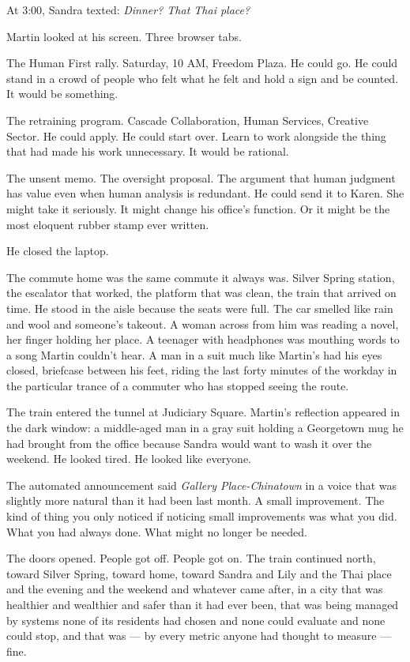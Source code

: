\documentclass[11pt]{article}
\begin{document}
At 3:00, Sandra texted: \emph{Dinner? That Thai place?}

Martin looked at his screen. Three browser tabs.

The Human First rally. Saturday, 10 AM, Freedom Plaza. He could go. He could stand in a crowd of people who felt what he felt and hold a sign and be counted. It would be something.

The retraining program. Cascade Collaboration, Human Services, Creative Sector. He could apply. He could start over. Learn to work alongside the thing that had made his work unnecessary. It would be rational.

The unsent memo. The oversight proposal. The argument that human judgment has value even when human analysis is redundant. He could send it to Karen. She might take it seriously. It might change his office's function. Or it might be the most eloquent rubber stamp ever written.

He closed the laptop.

The commute home was the same commute it always was. Silver Spring station, the escalator that worked, the platform that was clean, the train that arrived on time. He stood in the aisle because the seats were full. The car smelled like rain and wool and someone's takeout. A woman across from him was reading a novel, her finger holding her place. A teenager with headphones was mouthing words to a song Martin couldn't hear. A man in a suit much like Martin's had his eyes closed, briefcase between his feet, riding the last forty minutes of the workday in the particular trance of a commuter who has stopped seeing the route.

The train entered the tunnel at Judiciary Square. Martin's reflection appeared in the dark window: a middle-aged man in a gray suit holding a Georgetown mug he had brought from the office because Sandra would want to wash it over the weekend. He looked tired. He looked like everyone.

The automated announcement said \emph{Gallery Place-Chinatown} in a voice that was slightly more natural than it had been last month. A small improvement. The kind of thing you only noticed if noticing small improvements was what you did. What you had always done. What might no longer be needed.

The doors opened. People got off. People got on. The train continued north, toward Silver Spring, toward home, toward Sandra and Lily and the Thai place and the evening and the weekend and whatever came after, in a city that was healthier and wealthier and safer than it had ever been, that was being managed by systems none of its residents had chosen and none could evaluate and none could stop, and that was --- by every metric anyone had thought to measure --- fine.
\end{document}
